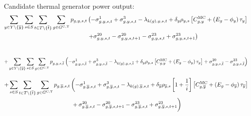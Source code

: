 \documentclass{article}
\begin{document}
Candidate thermal generator power output:
\begin{align}
\sum\limits_{\iYear \in \sYears 
	\setminus \{\iYearTerminal\}
}\sum\limits_{\iScenario \in \sScenarios}\sum\limits_{\iInterval \in \sIntervals \setminus \{\iIntervalTerminal\}} \sum\limits_{\iGenerator \in \sGeneratorsCandidateThermal} \vPower &\left( -\dMinPowerOutput + \dMaxPowerOutputCandidateThermal 
- \dPowerBalance[k(\iGenerator),\iYear,\iScenario,\iInterval] + \cDiscountRate \cScenarioDuration \left[\cMarginalCost + \left(\cEmissionsIntensity - \vBaseline\right)\vPermitPrice \right] \right. \nonumber\\
& \left. + \dRampRateUp - \dRampRateUp[\iGenerator,\iYear,\iScenario,\iInterval + 1] - \dRampRateDown + \dRampRateDown[\iGenerator,\iYear,\iScenario,\iInterval + 1]
\right)\\\nonumber
\end{align}

\begin{equation}
+ \sum\limits_{\iYear \in \sYears 
	\setminus \{\iYearTerminal\}
}\sum\limits_{\iScenario \in \sScenarios} \sum\limits_{\iGenerator \in \sGeneratorsCandidateThermal} \vPower[\iGenerator,\iYear,\iScenario,\iIntervalTerminal] \left(-\dMinPowerOutput[\iGenerator,\iYear,\iScenario,\iIntervalTerminal] + \dMaxPowerOutputCandidateThermal[\iGenerator,\iYear,\iScenario,\iIntervalTerminal] 
- \dPowerBalance[k(\iGenerator),\iYear,\iScenario,\iIntervalTerminal] + \cDiscountRate \cScenarioDuration \left[\cMarginalCost + \left(\cEmissionsIntensity - \vBaseline\right)\vPermitPrice \right] + \dRampRateUp[\iGenerator,\iYear,\iScenario,\iIntervalTerminal] - \dRampRateDown[\iGenerator,\iYear,\iScenario,\iIntervalTerminal] \right)\\
\end{equation}

\begin{align}
+ \sum\limits_{\iScenario \in \sScenarios} \sum\limits_{\iInterval \in \sIntervals \setminus \{\iIntervalTerminal\}} \sum\limits_{\iGenerator \in \sGeneratorsCandidateThermal} \vPower[\iGenerator,\iYearTerminal,\iScenario,\iInterval] & \left(-\dMinPowerOutput[\iGenerator,\iYearTerminal,\iScenario,\iInterval] + \dMaxPowerOutputCandidateThermal[\iGenerator,\iYearTerminal,\iScenario,\iInterval] - \dPowerBalance[k(\iGenerator),\iYearTerminal,\iScenario,\iInterval] + \cDiscountRate[\iYearTerminal] \cScenarioDuration[\iYearTerminal,\iScenario] \left[1 + \frac{1}{\cInterestRate}\right] \left[\cMarginalCost[\iGenerator,\iYearTerminal] + \left(\cEmissionsIntensity - \vBaseline[\iYearTerminal]\right)\vPermitPrice[\iYearTerminal] \right] \right.\nonumber\\
& \left. \vphantom{1 + \frac{1}{\cInterestRate}} + \dRampRateUp[\iGenerator,\iYearTerminal,\iScenario,\iInterval] - \dRampRateUp[\iGenerator,\iYearTerminal,\iScenario,\iInterval + 1] - \dRampRateDown[\iGenerator,\iYearTerminal,\iScenario,\iInterval] + \dRampRateDown[\iGenerator,\iYearTerminal,\iScenario,\iInterval + 1]
\right)\nonumber\\
\end{align}
\end{document}
